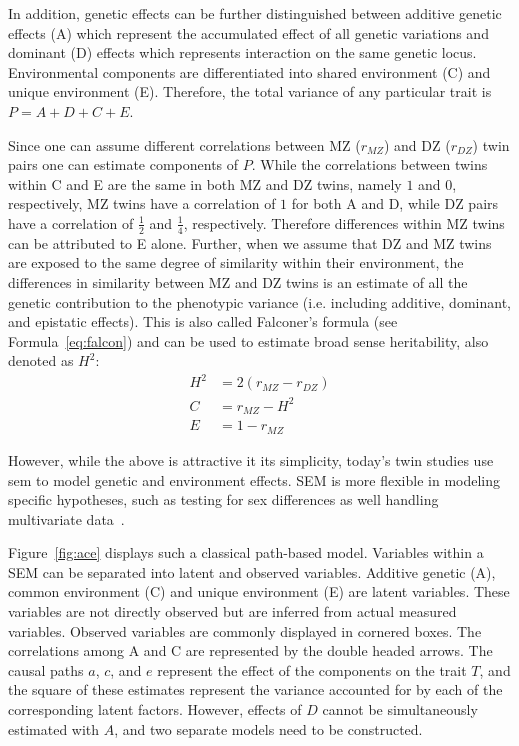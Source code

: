 In addition, genetic effects can be further distinguished between additive genetic effects (A) which represent the accumulated effect of all genetic variations and dominant (D) effects which represents interaction on the same genetic locus.
Environmental components are differentiated into shared environment (C) and unique environment (E).
Therefore, the total variance of any particular trait is $P = A+D+C+E$.

Since one can assume different correlations between MZ ($r_{MZ}$) and DZ ($r_{DZ}$) twin pairs one can estimate components of $P$.
While the correlations between twins within C and E are the same in both MZ and DZ twins, namely $1$ and $0$, respectively,
MZ twins have a correlation of $1$ for both A and D, while DZ pairs have a correlation of $\frac{1}{2}$ and $\frac{1}{4}$, respectively.
Therefore differences within MZ twins can be attributed to E alone.
Further, when we assume that DZ and MZ twins are exposed to the same degree of similarity within their environment, the differences in similarity between MZ and DZ twins is an estimate of all the genetic contribution to the phenotypic variance (i.e. including additive, dominant, and epistatic effects).
This is also called Falconer's formula (see Formula~\ref{eq:falcon}) and can be used to estimate broad sense heritability, also denoted as $H^2$:
\begin{align}
  H^2 &= 2(r_{MZ}-r_{DZ}) \label{eq:falcon} \\ 
  C &= r_{MZ} - H^2  \\
  E &= 1 - r_{MZ}  
\end{align}

However, while the above is attractive it its simplicity, today's twin studies use \acrfull{sem} to model genetic and environment effects.
SEM is more flexible in modeling specific hypotheses, such as testing for sex differences as well  handling multivariate data~\cite{Rijsdijk2002}.

Figure~\ref{fig:ace} displays such a classical path-based model.
Variables within a SEM can be separated into latent and observed variables.
Additive genetic (A), common environment (C) and unique environment (E) are  latent variables.
These variables are not directly observed but are inferred from actual measured variables.
Observed variables are commonly displayed in cornered boxes.
The correlations among A and C are represented by the double headed arrows.
The causal paths $a$, $c$, and $e$ represent the effect of the components on the trait $T$, and the square of these estimates represent the variance accounted for by each of the corresponding latent factors.
However, effects of $D$ cannot be simultaneously estimated with $A$, and two separate models need to be constructed.


